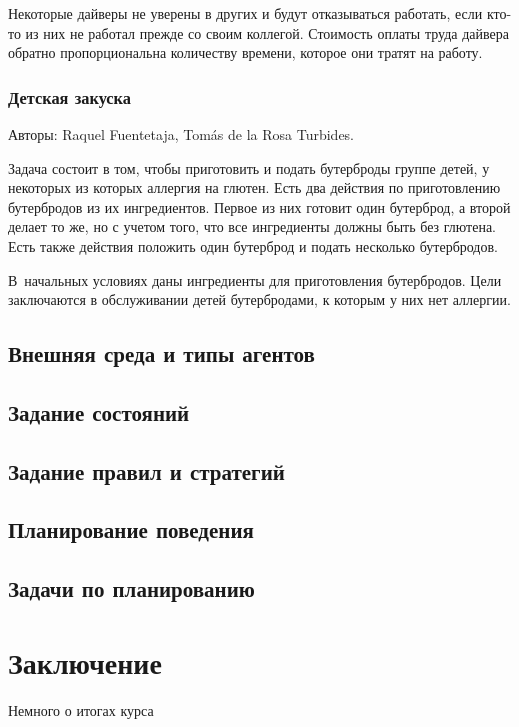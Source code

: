 \documentclass[b5paper,11pt]{book}
\begin{document}
	Некоторые дайверы не уверены в других и будут отказываться работать, если кто-то из них не работал прежде со своим коллегой. Стоимость оплаты труда дайвера обратно пропорциональна количеству времени, которое они тратят на работу. 
	\subsection{Детская закуска}
	Авторы: Raquel Fuentetaja, Tomás de la Rosa Turbides. 
	
	Задача состоит в том, чтобы приготовить и подать бутерброды группе детей, у некоторых из которых аллергия на глютен. Есть два действия по приготовлению бутербродов из их ингредиентов. Первое из них готовит один бутерброд, а второй делает то же, но с учетом того, что все ингредиенты должны быть без глютена. Есть также действия положить один бутерброд и подать несколько бутербродов. 
	
	В~начальных условиях даны ингредиенты для приготовления бутербродов. Цели заключаются в обслуживании детей бутербродами, к которым у них нет аллергии.
	\section{Внешняя среда и типы агентов}
	\section{Задание состояний}
	\section{Задание правил и стратегий}
	\section{Планирование поведения}
	\section{Задачи по планированию}
	
	

	\chapter*{Заключение}
	Немного о итогах курса
	\printbibliography
\end{document}
